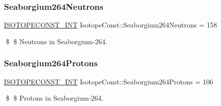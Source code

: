 \subsubsection{\texorpdfstring{Seaborgium264\+Neutrons}{Seaborgium264Neutrons}}
{\footnotesize\ttfamily \mbox{\hyperlink{group___isotope_const-_macros_ga5f18360b3e99483a35c32d789e62621c}{I\+S\+O\+T\+O\+P\+E\+C\+O\+N\+S\+T\+\_\+\+I\+NT}} Isotope\+Const\+::\+Seaborgium264\+Neutrons = 158}

\$ \$ Neutrons in Seaborgium-\/264. \mbox{\label{group___isotope_const-_seaborgium-_sg264_ga6076471b43c794211cb8dd2fe3438d1d}} 
\subsubsection{\texorpdfstring{Seaborgium264\+Protons}{Seaborgium264Protons}}
{\footnotesize\ttfamily \mbox{\hyperlink{group___isotope_const-_macros_ga5f18360b3e99483a35c32d789e62621c}{I\+S\+O\+T\+O\+P\+E\+C\+O\+N\+S\+T\+\_\+\+I\+NT}} Isotope\+Const\+::\+Seaborgium264\+Protons = 106}

\$ \$ Protons in Seaborgium-\/264. 